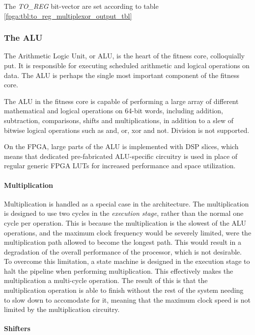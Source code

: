 The \emph{TO\_REG} bit-vector are set according to table \ref{fpga:tbl:to_reg_multiplexor_output_tbl}




\newpage
\subsubsection{The ALU}

The Arithmetic Logic Unit, or ALU, is the heart of the fitness core, colloquially put.
It is responsible for executing scheduled arithmetic and logical operations on data.
The ALU is perhaps the single most important component of the fitness core.

The ALU in the fitness core is capable of performing a large array of different mathematical and logical operations on 64-bit words, including addition, subtraction, comparisons, shifts and multiplications, in addition to a slew of bitwise logical operations such as and, or, xor and not.
Division is not supported.

On the FPGA, large parts of the ALU is implemented with \glspl{DSP slice}, which means that dedicated pre-fabricated ALU-specific circuitry is used in place of regular generic \gls{FPGA} \glspl{LUT} for increased performance and space utilization.

\paragraph{Multiplication}

Multiplication is handled as a special case in the architecture.
The multiplication is designed to use two cycles in the \emph{execution stage}, rather than the normal one cycle per operation.
This is because the multiplication is the slowest of the ALU operations, and the maximum clock frequency would be severely limited, were the multiplication path allowed to become the longest path.
This would result in a degradation of the overall performance of the processor, which is not desirable.
To overcome this limitation, a state machine is designed in the execution stage to halt the pipeline when performing multiplication.
This effectively makes the multiplication a multi-cycle operation.
The result of this is that the multiplication operation is able to finish without the rest of the system needing to slow down to accomodate for it, meaning that the maximum clock speed is not limited by the multiplication circuitry.

\paragraph{Shifters}

